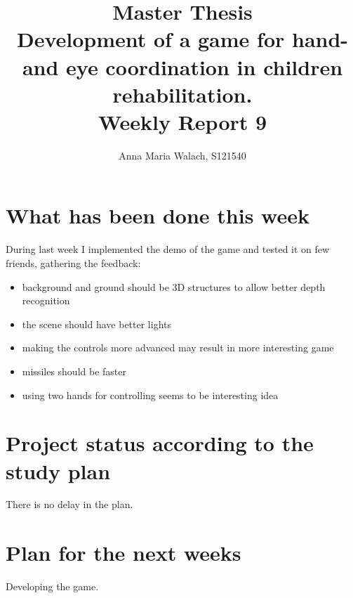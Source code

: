 \documentclass[10pt,a4paper]{article}
\title{{Master Thesis\\[0.5em]}
       {\bf \huge Development of a game for hand- and eye coordination in children rehabilitation.\\[0.5em]}
       {\bf Weekly Report 9}}
\author{Anna Maria Walach, S121540}
\begin{document}
\maketitle

\section*{What has been done this week}
During last week I implemented the demo of the game and tested it on few friends, gathering the feedback:
\begin{itemize}
\item background and ground should be 3D structures to allow better depth recognition
\item the scene should have better lights
\item making the controls more advanced may result in more interesting game
\item missiles should be faster
\item using two hands for controlling seems to be interesting idea
\end{itemize}

\section*{Project status according to the study plan}
There is no delay in the plan.

\section*{Plan for the next weeks}
Developing the game.



\end{document}
